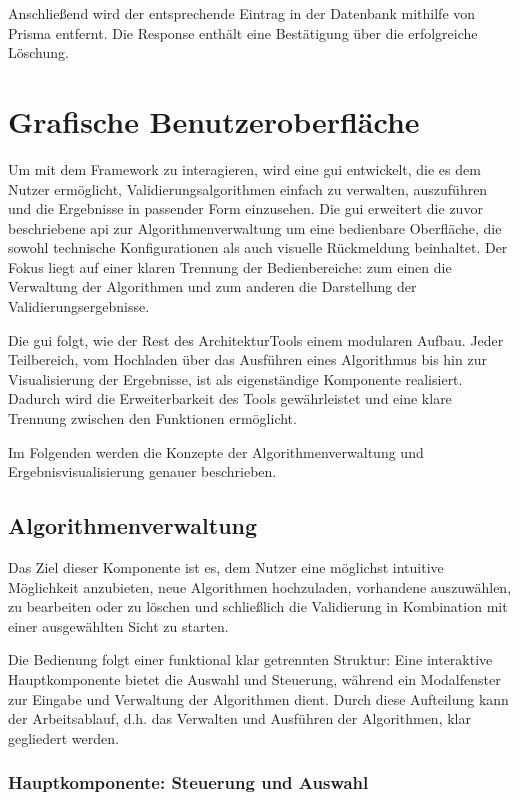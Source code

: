 Anschließend wird der entsprechende Eintrag in der Datenbank mithilfe von Prisma entfernt. Die Response enthält eine Bestätigung über die erfolgreiche Löschung.

\section{Grafische Benutzeroberfläche}

Um mit dem Framework zu interagieren, wird eine \gls{gui} entwickelt, die es dem Nutzer ermöglicht, Validierungsalgorithmen einfach zu verwalten, auszuführen und die Ergebnisse in passender Form einzusehen. Die \gls{gui} erweitert die zuvor beschriebene \gls{api} zur Algorithmenverwaltung um eine bedienbare Oberfläche, die sowohl technische Konfigurationen als auch visuelle Rückmeldung beinhaltet. Der Fokus liegt auf einer klaren Trennung der Bedienbereiche: zum einen die Verwaltung der Algorithmen und zum anderen die Darstellung der Validierungsergebnisse.

Die \gls{gui} folgt, wie der Rest des ArchitekturTools einem modularen Aufbau. Jeder Teilbereich, vom Hochladen über das Ausführen eines Algorithmus bis hin zur Visualisierung der Ergebnisse, ist als eigenständige Komponente realisiert. Dadurch wird die Erweiterbarkeit des Tools gewährleistet und eine klare Trennung zwischen den Funktionen ermöglicht.

Im Folgenden werden die Konzepte der Algorithmenverwaltung und Ergebnisvisualisierung genauer beschrieben.

\subsection{Algorithmenverwaltung}

Das Ziel dieser Komponente ist es, dem Nutzer eine möglichst intuitive Möglichkeit anzubieten, neue Algorithmen hochzuladen, vorhandene auszuwählen, zu bearbeiten oder zu löschen und schließlich die Validierung in Kombination mit einer ausgewählten Sicht zu starten.

Die Bedienung folgt einer funktional klar getrennten Struktur: Eine interaktive Hauptkomponente bietet die Auswahl und Steuerung, während ein Modalfenster zur Eingabe und Verwaltung der Algorithmen dient. Durch diese Aufteilung kann der Arbeitsablauf, d.h. das Verwalten und Ausführen der Algorithmen, klar gegliedert werden.

\subsubsection*{Hauptkomponente: Steuerung und Auswahl}

